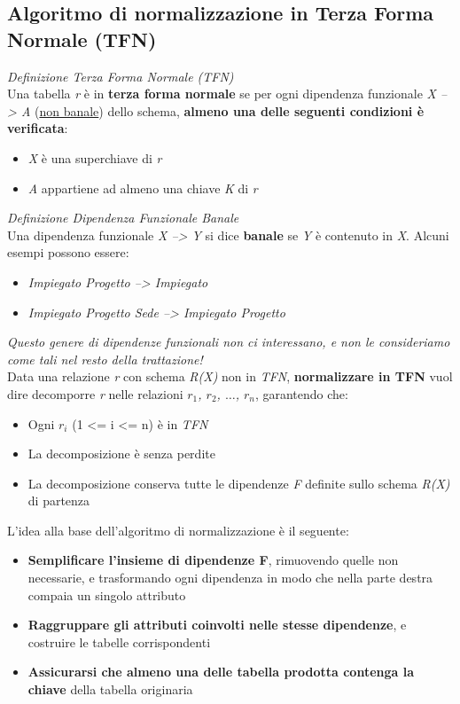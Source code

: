 \documentclass{article}
\begin{document}
\subsection*{Algoritmo di normalizzazione in Terza Forma Normale (TFN)}
\large
\textit{Definizione Terza Forma Normale (TFN)}\\
Una tabella \textit{r} è in \textbf{terza forma normale} se per ogni dipendenza funzionale \textit{X --> A} (\underline{non banale}) dello schema, \textbf{almeno una delle seguenti condizioni è verificata}:
\begin{itemize}[label={-}, leftmargin=1cm]
    \itemsep0em
    \item \textit{X} è una superchiave di \textit{r}
    \item \textit{A} appartiene ad almeno una chiave \textit{K} di \textit{r}
\end{itemize}
\textit{Definizione Dipendenza Funzionale Banale}\\
Una dipendenza funzionale \textit{X --> Y} si dice \textbf{banale} se \textit{Y} è contenuto in \textit{X}. Alcuni esempi possono essere:
\begin{itemize}[label={-}, leftmargin=1cm]
    \itemsep0em
    \item \textit{Impiegato Progetto --> Impiegato}
    \item \textit{Impiegato Progetto Sede --> Impiegato Progetto}
\end{itemize}
\textit{Questo genere di dipendenze funzionali non ci interessano, e non le consideriamo come tali nel resto della trattazione!}\vspace{14pt}\\
Data una relazione \textit{r} con schema \textit{R(X)} non in \textit{TFN}, \textbf{normalizzare in TFN} vuol dire decomporre \textit{r} nelle relazioni \textit{$r_1$, $r_2$, $\dots$, $r_n$}, garantendo che:
\begin{itemize}[label={-}, leftmargin=1cm]
    \itemsep0em
    \item Ogni $r_i$ (1 <= i <= n) è in \textit{TFN}
    \item La decomposizione è senza perdite
    \item La decomposizione conserva tutte le dipendenze \textit{F} definite sullo schema \textit{R(X)} di partenza\\
\end{itemize}
L'idea alla base dell'algoritmo di normalizzazione è il seguente:
\begin{itemize}[label={-}, leftmargin=1cm]
    \itemsep0em
    \item \textbf{Semplificare l'insieme di dipendenze F}, rimuovendo quelle non necessarie, e trasformando ogni dipendenza in modo che nella parte destra compaia un singolo attributo
    \item \textbf{Raggruppare gli attributi coinvolti nelle stesse dipendenze}, e costruire le tabelle corrispondenti
    \item \textbf{Assicurarsi che almeno una delle tabella prodotta contenga la chiave} della tabella originaria\\
\end{itemize}
\end{document}
